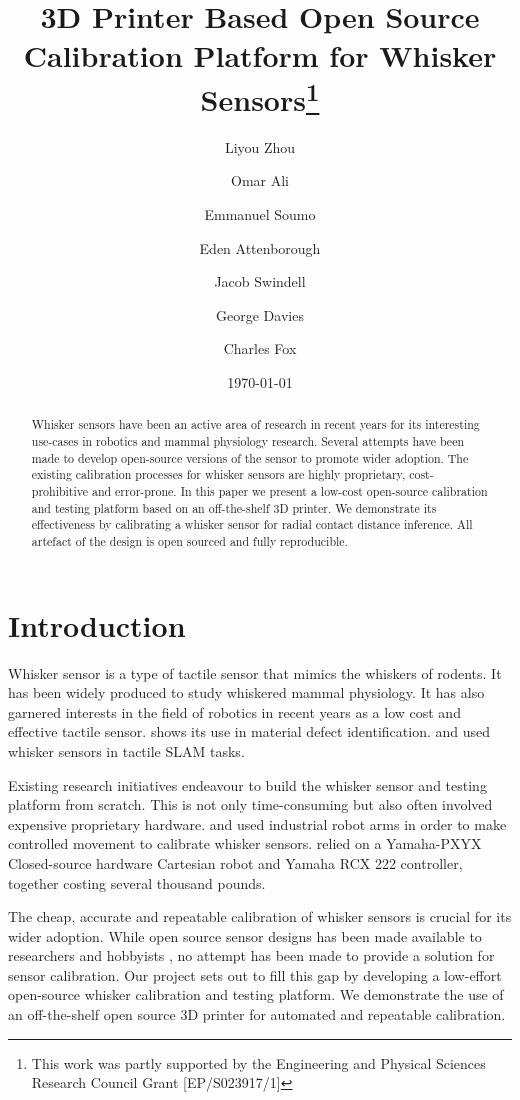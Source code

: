 \documentclass[runningheads]{llncs}
\title{3D Printer Based Open Source Calibration Platform for Whisker Sensors\thanks{This work was partly supported by the Engineering and Physical Sciences
Research Council Grant [EP/S023917/1]}}
\author{
    Liyou Zhou\orcidID{0009-0005-9491-9003} \and
    Omar Ali \and
    Emmanuel Soumo \and
    Eden Attenborough \and
    Jacob Swindell \and
    George Davies \and
    Charles Fox
}
\institute{School of Computer Science, University of Lincoln, Lincoln, UK}
\date{\today}
\begin{document}
\maketitle

\begin{abstract}
Whisker sensors have been an active area of research in recent years for its interesting use-cases in robotics and mammal physiology research. Several attempts have been made to develop open-source versions of the sensor to promote wider adoption. The existing calibration processes for whisker sensors are highly proprietary, cost-prohibitive and error-prone. In this paper we present a low-cost open-source calibration and testing platform based on an off-the-shelf 3D printer. We demonstrate its effectiveness by calibrating a whisker sensor for radial contact distance inference. All artefact of the design is open sourced and fully reproducible.
\end{abstract}

\section{Introduction}

Whisker sensor is a type of tactile sensor that mimics the whiskers of rodents. It has been widely produced to study whiskered mammal physiology\cite{prescottActiveTouchSensing2020}. It has also garnered interests in the field of robotics in recent years as a low cost and effective tactile sensor. \cite{fotouhiDetectionBarelyVisible2021} shows its use in material defect identification. \cite{struckmeierViTaSLAMBioinspiredVisuoTactile2019} and \cite{foxTactileSLAMBiomimetic2012} used whisker sensors in tactile SLAM tasks.

Existing research initiatives endeavour to build the whisker sensor and testing platform from scratch. This is not only time-consuming but also often involved expensive proprietary hardware. \cite{sullivanTactileDiscriminationUsing2012a} and \cite{fotouhiDetectionBarelyVisible2021} used industrial robot arms in order to make controlled movement to calibrate whisker sensors. \cite{evansWhiskerobjectContactSpeed2010a} relied on a Yamaha-PXYX Closed-source hardware Cartesian robot and Yamaha RCX 222 controller, together costing several thousand pounds.

The cheap, accurate and repeatable calibration of whisker sensors is crucial for its wider adoption. While open source sensor designs has been made available to researchers and hobbyists \cite{RatatouilleWhiskersOpenWhiskerOpen}, no attempt has been made to provide a solution for sensor calibration. Our project sets out to fill this gap by developing a low-effort open-source whisker calibration and testing platform. We demonstrate the use of an off-the-shelf open source 3D printer for automated and repeatable calibration.
\end{document}
